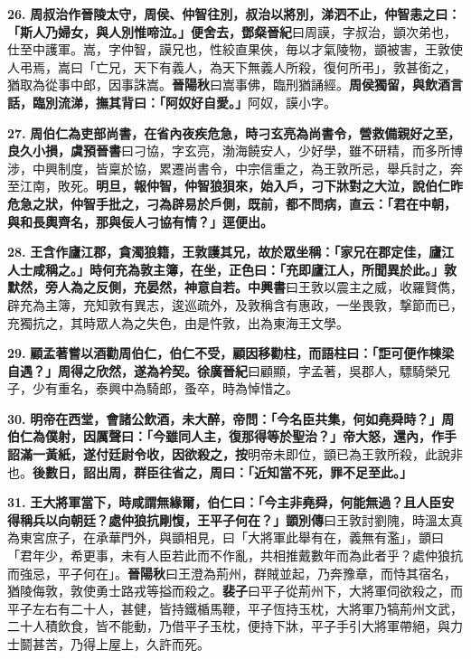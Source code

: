 \textbf{26.} \textbf{周叔治作晉陵太守，周侯、仲智往別，叔治以將別，涕泗不止，仲智恚之曰：「斯人乃婦女，與人別惟啼泣。」便舍去，}{\footnotesize \textbf{鄧粲晉紀}曰周謨，字叔治，顗次弟也，仕至中護軍。嵩，字仲智，謨兄也，性絞直果俠，毎以才氣陵物，顗被害，王敦使人弔焉，嵩曰「亡兄，天下有義人，為天下無義人所殺，復何所弔」，敦甚銜之，猶取為從事中郎，因事誅嵩。\textbf{晉陽秋}曰嵩事佛，臨刑猶誦經。}\textbf{周侯獨留，與飲酒言話，臨別流涕，撫其背曰：「阿奴好自愛。」}{\footnotesize 阿奴，謨小字。}

\textbf{27.} \textbf{周伯仁為吏部尚書，在省內夜疾危急，時刁玄亮為尚書令，營救備親好之至，良久小損，}{\footnotesize \textbf{虞預晉書}曰刁協，字玄亮，渤海饒安人，少好學，雖不研精，而多所博涉，中興制度，皆稟於協，累遷尚書令，中宗信重之，為王敦所忌，舉兵討之，奔至江南，敗死。}\textbf{明旦，報仲智，仲智狼狽來，始入戶，刁下牀對之大泣，說伯仁昨危急之狀，仲智手批之，刁為辟易於戶側，既前，都不問病，直云：「君在中朝，與和長輿齊名，那與佞人刁協有情？」逕便出。}

\textbf{28.} \textbf{王含作廬江郡，貪濁狼籍，王敦護其兄，故於眾坐稱：「家兄在郡定佳，廬江人士咸稱之。」時何充為敦主簿，在坐，正色曰：「充即廬江人，所聞異於此。」敦默然，旁人為之反側，充晏然，神意自若。}{\footnotesize \textbf{中興書}曰王敦以震主之威，收羅賢儁，辟充為主簿，充知敦有異志，逡巡疏外，及敦稱含有惠政，一坐畏敦，撃節而已，充獨抗之，其時眾人為之失色，由是忤敦，出為東海王文學。}

\textbf{29.} \textbf{顧孟著嘗以酒勸周伯仁，伯仁不受，顧因移勸柱，而語柱曰：「詎可便作棟梁自遇？」周得之欣然，遂為衿契。}{\footnotesize \textbf{徐廣晉紀}曰顧顯，字孟著，吳郡人，驃騎榮兄子，少有重名，泰興中為騎郎，蚤卒，時為悼惜之。}

\textbf{30.} \textbf{明帝在西堂，會諸公飲酒，未大醉，帝問：「今名臣共集，何如堯舜時？」周伯仁為僕射，因厲聲曰：「今雖同人主，復那得等於聖治？」帝大怒，還內，作手詔滿一黃紙，遂付廷尉令收，因欲殺之，}{\footnotesize \textbf{按}明帝未即位，顗已為王敦所殺，此說非也。}\textbf{後數日，詔出周，群臣往省之，周曰：「近知當不死，罪不足至此。」}

\textbf{31.} \textbf{王大將軍當下，時咸謂無緣爾，伯仁曰：「今主非堯舜，何能無過？且人臣安得稱兵以向朝廷？處仲狼抗剛愎，王平子何在？」}{\footnotesize \textbf{顗別傳}曰王敦討劉隗，時溫太真為東宮庶子，在承華門外，與顗相見，曰「大將軍此舉有在，義無有濫」，顗曰「君年少，希更事，未有人臣若此而不作亂，共相推戴數年而為此者乎？處仲狼抗而強忌，平子何在」。\textbf{晉陽秋}曰王澄為荊州，群賊並起，乃奔豫章，而恃其宿名，猶陵侮敦，敦使勇士路戎等搤而殺之。\textbf{裴子}曰平子從荊州下，大將軍伺欲殺之，而平子左右有二十人，甚健，皆持鐵楯馬鞭，平子恆持玉枕，大將軍乃犒荊州文武，二十人積飲食，皆不能動，乃借平子玉枕，便持下牀，平子手引大將軍帶絕，與力士鬬甚苦，乃得上屋上，久許而死。}

